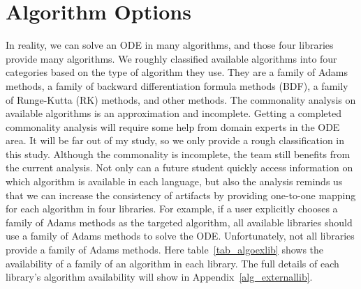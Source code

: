 \section{Algorithm Options}
In reality, we can solve an ODE in many algorithms, and those four libraries provide many algorithms. We roughly classified available algorithms into four categories based on the type of algorithm they use. They are a family of Adams methods, a family of backward differentiation formula methods (BDF), a family of Runge-Kutta (RK) methods, and other methods. The commonality analysis on available algorithms is an approximation and incomplete. Getting a completed commonality analysis will require some help from domain experts in the ODE area. It will be far out of my study, so we only provide a rough classification in this study. Although the commonality is incomplete, the team still benefits from the current analysis. Not only can a future student quickly access information on which algorithm is available in each language, but also the analysis reminds us that we can increase the consistency of artifacts by providing one-to-one mapping for each algorithm in four libraries. For example, if a user explicitly chooses a family of Adams methods as the targeted algorithm, all available libraries should use a family of Adams methods to solve the ODE. Unfortunately, not all libraries provide a family of Adams methods. Here table~\ref{tab_algoexlib} shows the availability of a family of an algorithm in each library. The full details of each library's algorithm availability will show in Appendix~\ref{alg_externallib}.

